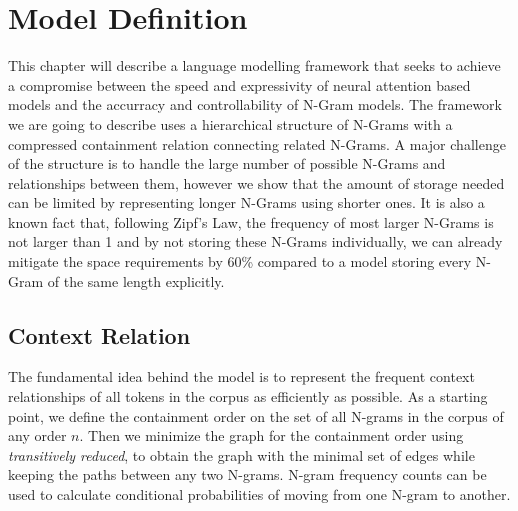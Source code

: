 \chapter{Model Definition}\label{chp:model}

This chapter will describe a language modelling framework that seeks to achieve a compromise between the speed and expressivity of neural attention based models and the accurracy and controllability of N-Gram models.
The framework we are going to describe uses a hierarchical structure of N-Grams with a compressed containment relation connecting related N-Grams. A major challenge of the structure is to handle the large number of possible N-Grams and relationships between them, however we show that the amount of storage needed can be limited by representing longer N-Grams using shorter ones. It is also a known fact that, following Zipf's Law, the frequency of most larger N-Grams is not larger than 1 and by not storing these N-Grams individually, we can already mitigate the space requirements by 60\% compared to a model storing every N-Gram of the same length explicitly.

\section{Context Relation}
The fundamental idea behind the model is to represent the frequent context relationships of all tokens in the corpus as efficiently as possible. As a starting point, we define the containment order on the set of all N-grams in the corpus of any order $n$. Then we minimize the graph for the containment order using \textit{transitively reduced}, to obtain the graph with the minimal set of edges while keeping the paths between any two N-grams. N-gram frequency counts can be used to calculate conditional probabilities of moving from one N-gram to another.


